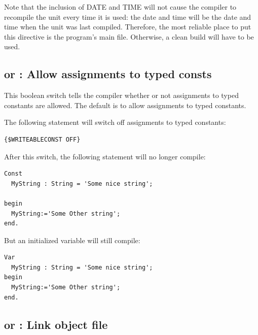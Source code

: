 \begin{remark}
Note that the inclusion of DATE and TIME will not cause the compiler to
recompile the unit every time it is used: the date and time will be the date
and time when the unit was last compiled.
Therefore, the most reliable place to put this directive is the program's main
file. Otherwise, a clean build will have to be used.
\end{remark}


%
%

\subsection{ or  : Allow
assignments to typed consts}
This boolean switch tells the compiler whether or not assignments to typed 
constants are allowed. The default is to allow assignments to typed constants.

The following statement will switch off assignments to typed constants:
\begin{verbatim}
{$WRITEABLECONST OFF}
\end{verbatim}
After this switch, the following statement will no longer compile:
\begin{verbatim}
Const
  MyString : String = 'Some nice string';

begin
  MyString:='Some Other string';
end.
\end{verbatim}
But an initialized variable will still compile:
\begin{verbatim}
Var
  MyString : String = 'Some nice string';
begin
  MyString:='Some Other string';
end.
\end{verbatim}



\subsection{ or  : Link object file}

